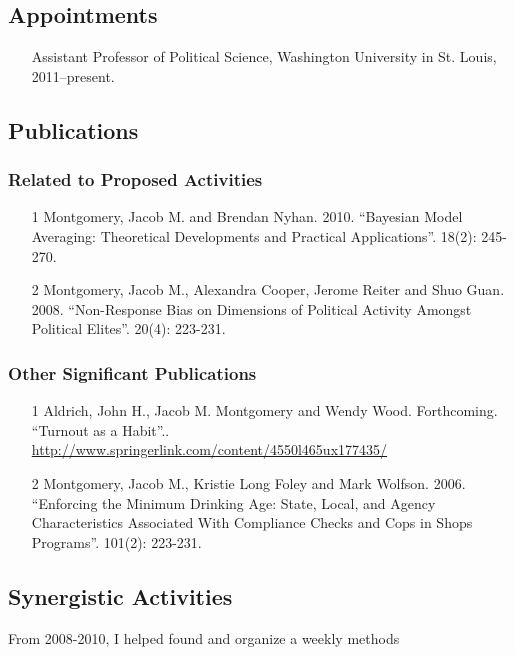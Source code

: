 \documentclass[pdftex,12pt,fullpage,oneside]{amsart}
\begin{document}
\subsection*{Appointments}
\begin{itemize}
\item[] Assistant Professor of Political Science, Washington
  University in St. Louis, 2011--present.
\end{itemize}

\subsection*{Publications}
\subsubsection*{Related to Proposed Activities}
\begin{itemize}
\item[1] Montgomery, Jacob M. and Brendan Nyhan. 2010. ``Bayesian Model Averaging: Theoretical Developments and
Practical Applications''.  18(2): 245-270.

\item[2] Montgomery, Jacob M., Alexandra Cooper, Jerome Reiter and Shuo Guan. 2008. ``Non-Response Bias on Dimensions of Political Activity
Amongst Political Elites''.  20(4): 223-231.
\end{itemize}

\subsubsection*{Other Significant Publications}
\begin{itemize}
\item[1] Aldrich, John H., Jacob M. Montgomery and Wendy Wood. Forthcoming. ``Turnout as a Habit''.. 
\newblock \url{http://www.springerlink.com/content/4550l465ux177435/}

\item[2] Montgomery, Jacob M., Kristie Long Foley and Mark Wolfson. 2006. ``Enforcing the Minimum Drinking Age: State, Local, and Agency Characteristics Associated With Compliance Checks and Cops in Shops Programs''.  101(2): 223-231.
\end{itemize}


\subsection*{Synergistic Activities}
From 2008-2010, I helped found and organize a weekly methods
\end{document}
